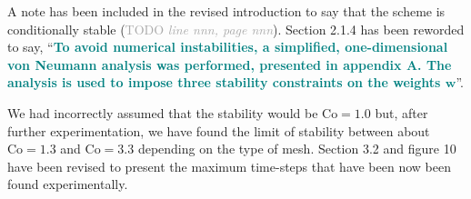 \documentclass[times]{elsarticle}
\newcommand{\TODO}[1]{\textcolor{darkgray}{TODO \textit{#1}}}
\newcommand{\revtwo}[1]{\textcolor{teal}{\textbf{#1}}}
\begin{document}
\begin{quotation}
\begin{comment}
\item It is claimed in several places that the scheme is stable, but some qualification
is appropriate. First, the scheme is {\it conditionally} stable; the Courant number
should not be too large. Then Appendix~A gives an analysis deriving constraints
on the polynomial reconstruction that should be satisfied for stability. However,
the analysis is idealized in various ways: one-dimensional, regular grid, constant $v$,
two- and three-cell stencils, and ignoring the time discretization (also see below).
That is fair enough---it might not be possible to generalize the analysis to the full
scheme---and it is clearly stated at the end of the Appendix that the constraints are
{\it hypothesized} to apply more generally. However, in section 2.1.4 the language is
stronger and suggests that these constraints are definitive: ``...stability constraints...'',
``...must satisfy...'', etc.
\end{comment}
\end{quotation}
A note has been included in the revised introduction to say that the scheme is conditionally stable (\TODO{line nnn, page nnn}).
Section 2.1.4 has been reworded to say, ``\revtwo{To avoid numerical instabilities, a simplified, one-dimensional von Neumann analysis was performed, presented in appendix A.  The analysis is used to impose three stability constraints on the weights $\mathbf{w}$}''.

\begin{quotation}
\begin{comment}
\item P14. The calculation of the longest stable timestep {\it assumes} that the stability
limit is given by $\mathrm{Co}=1$. Given the idealized nature of the analysis in
Appendix~A, and that most experiments are done with $\mathrm{Co} \approx 0.4$,
at least some empirical investigation of the stability limit should be discussed
to confirm that it is indeed (exactly or approximately) $\mathrm{Co}=1$.
\end{comment}
\end{quotation}
We had incorrectly assumed that the stability would be $\mathrm{Co} = 1.0$ but, after further experimentation, we have found the limit of stability between about $\mathrm{Co} = 1.3$ and $\mathrm{Co} = 3.3$ depending on the type of mesh.  Section 3.2 and figure 10 have been revised to present the maximum time-steps that have been now been found experimentally.
\end{document}
